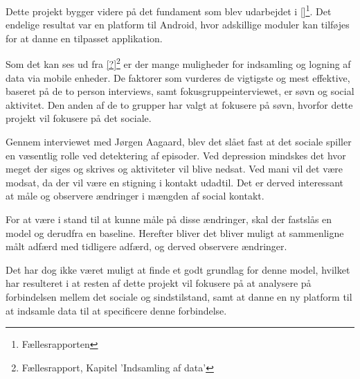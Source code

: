 Dette projekt bygger videre på det fundament som blev udarbejdet i \cref{}\footnote{Fællesrapporten}.
Det endelige resultat var en platform til Android, hvor adskillige moduler kan tilføjes for at danne en tilpasset applikation.

Som det kan ses ud fra \cref{?}\footnote{Fællesrapport, Kapitel 'Indsamling af data'} er der mange muligheder for indsamling og logning af data via mobile enheder.
De faktorer som vurderes de vigtigste og mest effektive, baseret på de to person interviews, samt fokusgruppeinterviewet, er søvn og social aktivitet.
Den anden af de to grupper har valgt at fokusere på søvn, hvorfor dette projekt vil fokusere på det sociale.

Gennem interviewet med Jørgen Aagaard, blev det slået fast at det sociale spiller en væsentlig rolle ved detektering af episoder.
Ved depression mindskes det hvor meget der siges og skrives og aktiviteter vil blive nedsat.
Ved mani vil det være modsat, da der vil være en stigning i kontakt udadtil.
Det er derved interessant at måle og observere ændringer i mængden af social kontakt.

For at være i stand til at kunne måle på disse ændringer, skal der fastslås en model og derudfra en baseline.
Herefter bliver det bliver muligt at sammenligne målt adfærd med tidligere adfærd, og derved observere ændringer.

Det har dog ikke været muligt at finde et godt grundlag for denne model, hvilket har resulteret i at resten af dette projekt vil fokusere på at analysere på forbindelsen mellem det sociale og sindstilstand, samt at danne en ny platform til at indsamle data til at specificere denne forbindelse.